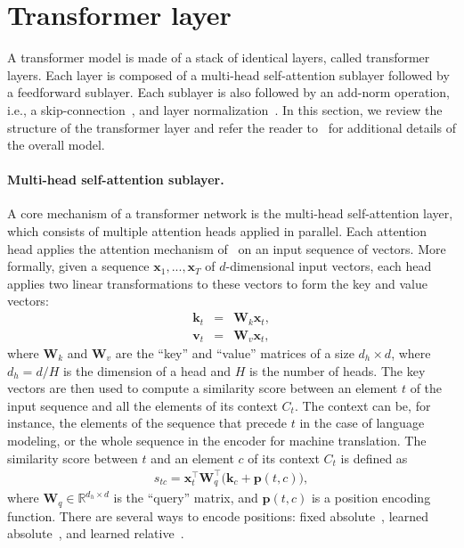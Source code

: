 \documentclass{article}
\begin{document}
\section{Transformer layer}
A transformer model is made of a stack of identical layers, called transformer layers.
Each layer is composed of a multi-head self-attention sublayer followed by a feedforward sublayer.
Each sublayer is also followed by an add-norm operation, i.e., a skip-connection~\cite{he2016deep}, and layer normalization~\cite{ba2016layer}.
In this section, we review the structure of the transformer layer and refer the reader to~\citet{vaswani2017attention} for additional details of the overall model.

\paragraph{Multi-head self-attention sublayer.}
A core mechanism of a transformer network is the multi-head self-attention layer, which consists of multiple attention heads applied in parallel.
Each attention head applies the attention mechanism of~\citet{bahdanau2014neural} on an input sequence of vectors.
More formally, given a sequence $\mathbf{x}_1, ..., \mathbf{x}_T$ of $d$-dimensional input vectors, each head applies two linear transformations to these vectors to form the key and value vectors:
\begin{eqnarray}\label{eq:keyvals}
\mathbf{k}_t &=& \mathbf{W}_k \mathbf{x}_t, \\
\mathbf{v}_t &=& \mathbf{W}_v \mathbf{x}_t,
\end{eqnarray}
where $\mathbf{W}_k$ and $\mathbf{W}_v$ are the ``key'' and ``value'' matrices of a size $d_h\times d$, where $d_h=d / H$ is the dimension of a head and $H$ is the number of heads.
The key vectors are then used to compute a similarity score between an element $t$ of the input sequence and all the elements of its context $C_t$.
The context can be, for instance, the elements of the sequence that precede $t$ in the case of language modeling, or the whole sequence in the encoder for machine translation.
The similarity score between $t$ and an element $c$ of its context $C_t$ is defined as
\begin{eqnarray}\label{eq:sim}
  s_{tc}= \mathbf{x}_t^\top \mathbf{W}_q^\top \big(\mathbf{k}_c + \mathbf{p}(t, c)\big),
\end{eqnarray}
where $\mathbf{W}_q \in \mathbb{R}^{d_h \times d}$ is the ``query'' matrix, and $\mathbf{p}(t, c)$ is a position encoding function.
There are several ways to encode positions: fixed absolute~\citep{vaswani2017attention}, learned absolute~\citep{al2018character}, and learned relative~\citep{sukhbaatar2015end,shaw2018self}.
\end{document}
